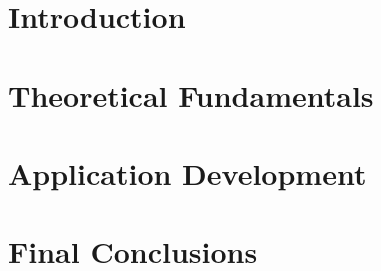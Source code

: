\documentclass[a4paper, 12pt]{report}
\begin{document}





\tableofcontents

\listoftables
\listoffigures
\listofalgorithms


\chapter{Introduction}


\chapter{Theoretical Fundamentals}


\chapter{Application Development}


\chapter{Final Conclusions}




\nocite{*}
\printbibliography[heading=bibintoc, title={Bibliography}]
\end{document}
